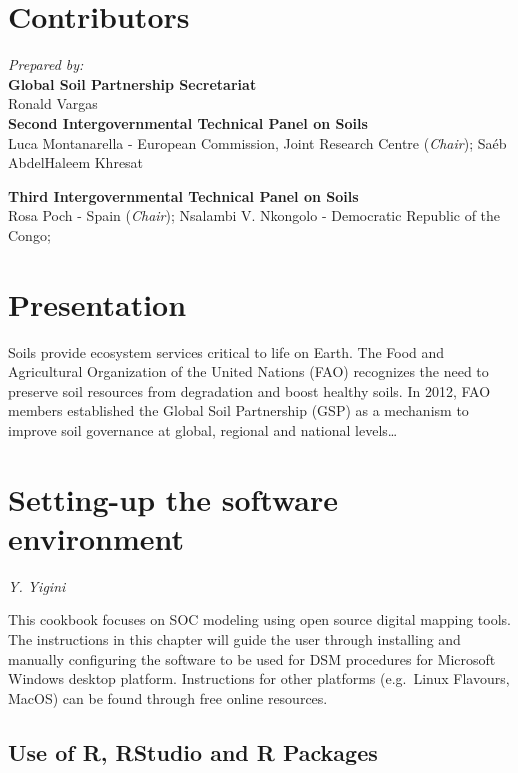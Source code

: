 \documentclass[
  10pt,
  b5paper,
  oneside]{book}
\begin{document}
\hypertarget{contributors}{%
\chapter*{Contributors}\label{contributors}}

\emph{Prepared by:}\\
\textbf{Global Soil Partnership Secretariat}\\
Ronald Vargas\\

\textbf{Second Intergovernmental Technical Panel on Soils}\\
Luca Montanarella - European Commission, Joint Research Centre
(\emph{Chair}); Saéb AbdelHaleem Khresat

\textbf{Third Intergovernmental Technical Panel on Soils}\\
Rosa Poch - Spain (\emph{Chair}); Nsalambi V. Nkongolo - Democratic Republic
of the Congo;

\mainmatter

\hypertarget{presentation}{%
\chapter{Presentation}\label{presentation}}

Soils provide ecosystem services critical to life on Earth. The Food and Agricultural Organization of the United Nations (FAO) recognizes the need to preserve soil resources from degradation and boost healthy soils. In 2012, FAO members established the Global Soil Partnership (GSP) as a mechanism to improve soil governance at global, regional and national levels\ldots{}

\hypertarget{setting-up-the-software-environment}{%
\chapter{Setting-up the software environment}\label{setting-up-the-software-environment}}

\emph{Y. Yigini}

This cookbook focuses on SOC modeling using open source digital mapping tools. The instructions in this chapter will guide the user through installing and manually configuring the software to be used for DSM procedures for Microsoft Windows desktop platform. Instructions for other platforms (e.g.~Linux Flavours, MacOS) can be found through free online resources.

\hypertarget{use-of-r-rstudio-and-r-packages}{%
\section{Use of R, RStudio and R Packages}\label{use-of-r-rstudio-and-r-packages}}
\end{document}
